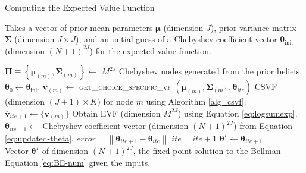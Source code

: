 \documentclass[11pt]{article}
\begin{document}
\newpage
\null
\vfill
\begin{algorithm}[!htpb]
	\caption{Computing the Expected Value Function} \label{alg_evf}
    \vspace{1em} 
	Takes a vector of prior mean parameters $\boldsymbol{\mu}$ (dimension $J$), prior variance matrix $\boldsymbol{\Sigma}$ (dimension $J \times J$), and an initial guess of a Chebyshev coefficient vector $\boldsymbol{\theta}_{\text{init}}$ (dimension ${(N + 1)}^{2J}$) for the expected value function. \vspace{1em} 
    \begin{onehalfspace}
	\begin{algorithmic}[1]
    \State $\boldsymbol{\Pi} \equiv \left\{ \boldsymbol{\mu}_{(m)}, \boldsymbol{\Sigma}_{(m)}\right\} \gets $ $M^{2J}$ Chebyshev nodes generated from the prior beliefs.
    \State $\boldsymbol{\theta}_{0} \gets  \boldsymbol{\theta}_{\text{init}}$ 
     
	 
    \State $\boldsymbol{v}_{(m)} \gets $ \textsc{get\_choice\_specific\_vf} $\left( \boldsymbol{\mu}_{(m)}, \boldsymbol{\Sigma}_{(m)}, \boldsymbol{\theta}_{ite} \right)$ CSVF (dimension $(J + 1) \times K$) for node $m$ using Algorithm \ref{alg_csvf}.
    \EndFor
    \State $\overline{\boldsymbol{v}}_{ite + 1} \gets \{\boldsymbol{v}_{(m)}\}$ Obtain EVF (dimension $M^{2J}$) using Equation \ref{eq:logsumexp}.
    \State $\boldsymbol{\theta}_{ite + 1} \gets $ Chebyshev coefficient vector (dimension ${(N + 1)}^{2J}$) from Equation \ref{eq:updated-theta}.
    \State $error = \left\| \boldsymbol{\theta}_{ite+1} - \boldsymbol{\theta}_{ite} \right\|$ 
    \State $ite = ite + 1$
    \EndWhile
    \State$\boldsymbol{\theta}^\star \gets \boldsymbol{\theta}_{ite+1}$	\\
	\Return Vector $\boldsymbol{\theta}^\star$ of dimension ${(N + 1)}^{2J}$, the fixed-point solution to the Bellman Equation \ref{eq:BE-num} given the inputs.
    \EndFunction 
	\end{algorithmic}
    \end{onehalfspace}
	\vspace{0.5em} 
\end{algorithm}
\vfill
\end{document}
